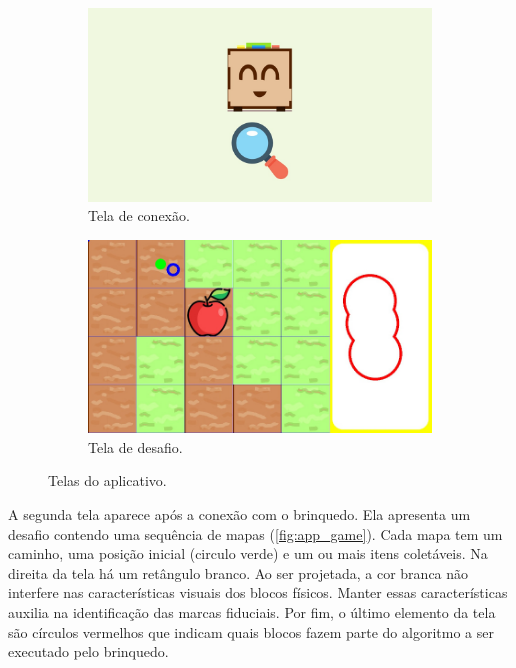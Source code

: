 \begin{figure}[!h]
    \begin{subfigure}{.5\textwidth}
        \centering
        \includegraphics[width=.9\linewidth,fbox]{figs/app_connection.jpeg}
        \caption{Tela de conexão.}
        \label{fig:app_connection}
    \end{subfigure}
    \begin{subfigure}{.5\textwidth}
        \centering
        \includegraphics[width=.9\linewidth,fbox]{figs/app_game.jpeg}
        \caption{Tela de desafio.}
        \label{fig:app_game}
    \end{subfigure}
    \caption{Telas do aplicativo.}
    \label{fig:app_screens}
\end{figure}

A segunda tela aparece após a conexão com o brinquedo. Ela apresenta um desafio contendo uma sequência de mapas (\autoref{fig:app_game}). Cada mapa tem um caminho, uma posição inicial (circulo verde) e um ou mais itens coletáveis. Na direita da tela há um retângulo branco. Ao ser projetada, a cor branca não interfere nas características visuais dos blocos físicos. Manter essas características auxilia na identificação das marcas fiduciais. Por fim, o último elemento da tela são círculos vermelhos que indicam quais blocos fazem parte do algoritmo a ser executado pelo brinquedo. 

